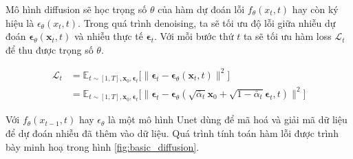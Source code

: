 	Mô hình diffusion sẽ học trọng số $\theta$ của hàm dự đoán lỗi $f_{\theta} (x_t, t)$ hay còn ký hiệu là  $\epsilon_{\theta} (x_t, t)$. Trong quá trình denoising, ta sẽ tối ưu độ lỗi giữa nhiễu dự đoán $\boldsymbol{\epsilon}_\theta(\mathbf{x}_t, t)$ và nhiễu thực tế $\boldsymbol{\epsilon}_t$. Với mỗi bước thứ $t$ ta sẽ tối ưu hàm loss $\mathcal{L}_{t}$ để thu được trọng số $\theta$.
	
	\begin{equation}
		\label{eq:diffusion_loss}
		\begin{aligned}
			\mathcal{L}_t
			&= \mathbb{E}_{t \sim [1, T], \mathbf{x}_0, \boldsymbol{\epsilon}_t} \Big[\|\boldsymbol{\epsilon}_t - \boldsymbol{\epsilon}_\theta(\mathbf{x}_t, t)\|^2 \Big] \\
			&= \mathbb{E}_{t \sim [1, T], \mathbf{x}_0, \boldsymbol{\epsilon}_t} \Big[\|\boldsymbol{\epsilon}_t - \boldsymbol{\epsilon}_\theta(\sqrt{\bar{\alpha}_t}\mathbf{x}_0 + \sqrt{1 - \bar{\alpha}_t}\boldsymbol{\epsilon}_t, t)\|^2 \Big]
		\end{aligned}
	\end{equation}
	
	
Với $f_{\theta}(x_{t-1}, t)$ hay $\epsilon_\theta$ là một mô hình Unet dùng để mã hoá và giải mã dữ liệu để dự đoán nhiễu đã thêm vào dữ liệu. Quá trình tính toán hàm lỗi được trình bày minh hoạ trong hình \ref{fig:basic_diffusion}.


